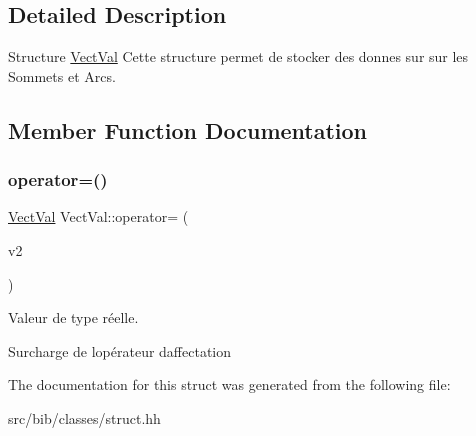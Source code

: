 \subsection{Detailed Description}
Structure \hyperlink{structVectVal}{Vect\+Val} Cette structure permet de stocker des donnes sur sur les Sommets et Arcs. 

\subsection{Member Function Documentation}
\mbox{\label{structVectVal_a93625cc50fedf5f624ad56f791fd9124}} 
\subsubsection{\texorpdfstring{operator=()}{operator=()}}
{\footnotesize\ttfamily \hyperlink{structVectVal}{Vect\+Val} Vect\+Val\+::operator= (\begin{DoxyParamCaption}\item[{\hyperlink{structVectVal}{Vect\+Val}}]{v2 }\end{DoxyParamCaption})\hspace{0.3cm}{\ttfamily [inline]}}



Valeur de type r\'{e}elle. 

Surcharge de l\textquotesingle{}op\'{e}rateur d\textquotesingle{}affectation 

The documentation for this struct was generated from the following file\+:\begin{DoxyCompactItemize}
\item 
src/bib/classes/struct.\+hh\end{DoxyCompactItemize}
